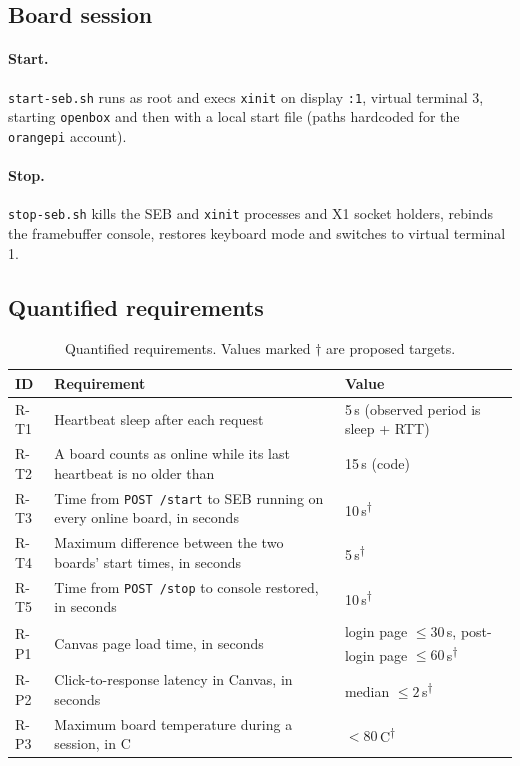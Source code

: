 \documentclass[11pt]{article}
\newcommand{\prop}{\textsuperscript{$\dagger$}}
\begin{document}
\subsection{Board session}

\paragraph{Start.} \texttt{start-seb.sh} runs as root and execs \texttt{xinit} on display \texttt{:1}, virtual terminal 3, starting \texttt{openbox} and then  with a local start file (paths hardcoded for the \texttt{orangepi} account).

\paragraph{Stop.} \texttt{stop-seb.sh} kills the SEB and \texttt{xinit} processes and X1 socket holders, rebinds the framebuffer console, restores keyboard mode and switches to virtual terminal 1.

\subsection{Quantified requirements}

\begin{table}[H]
  \centering
  \footnotesize
  \begin{tabularx}{\textwidth}{@{}l X l@{}}
    \toprule
    \textbf{ID} & \textbf{Requirement} & \textbf{Value} \\
    \midrule
    R-T1 & Heartbeat sleep after each request & 5\,s (observed period is sleep + RTT) \\
    R-T2 & A board counts as online while its last heartbeat is no older than & 15\,s (code) \\
    R-T3 & Time from \texttt{POST /start} to SEB running on every online board, in seconds & 10\,s\prop \\
    R-T4 & Maximum difference between the two boards' start times, in seconds & 5\,s\prop \\
    R-T5 & Time from \texttt{POST /stop} to console restored, in seconds & 10\,s\prop \\
    R-P1 & Canvas page load time, in seconds & login page $\le 30$\,s, post-login page $\le 60$\,s\prop \\
    R-P2 & Click-to-response latency in Canvas, in seconds & median $\le 2$\,s\prop \\
    R-P3 & Maximum board temperature during a session, in \textdegree{}C & $< 80$\,\textdegree{}C\prop \\
    \bottomrule
  \end{tabularx}
  \caption{Quantified requirements. Values marked $\dagger$ are proposed targets.}
  \label{tab:req}
\end{table}
\end{document}
